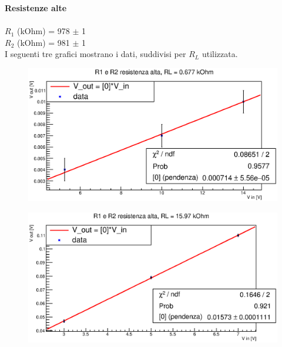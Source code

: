 %
    \textbf{Resistenze alte}\\\\		
    $R_1$ (kOhm) =	978 $\pm$ 1\\
    $R_2$ (kOhm) =	981 $\pm$ 1\\
    
    I seguenti tre grafici mostrano i dati, suddivisi per $R_L$ utilizzata.
    \begin{figure}[H]
    \centering
    \includegraphics[scale=.7]{Grafici/C1_P2_partResHigh1.eps}
    \end{figure}
    
    \begin{figure}[H]
    \centering
    \includegraphics[scale=.7]{Grafici/C1_P2_partResHigh2.eps}
    \end{figure}
    
